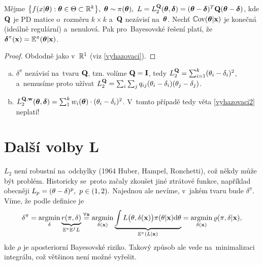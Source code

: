 \begin{theorem}[Vyhazovací 2]\label{vyhazovaci2}
	Mějme $\big\{ f(x|\boldsymbol{\theta}):\boldsymbol{\theta}\in\Theta\subset\mathbb{R}^k \big\},~\boldsymbol{\theta}\sim\pi(\boldsymbol{\theta}),~L=L_2^{\textbf{Q}}(\boldsymbol{\theta},\boldsymbol{\delta})=(\boldsymbol{\theta}-\boldsymbol{\delta})^T\textbf{Q}(\boldsymbol{\theta}-\boldsymbol{\delta})$, kde $\textbf{Q}$ je PD matice o~rozměru $k\times k$ a~$\textbf{Q}$ nezávisí na~$\boldsymbol{\theta}$. Nechť $\mathbb{C}\mathrm{ov}(\boldsymbol{\theta}|\textbf{x})$ je konečná (ideálně regulární) a~nenulová. Pak pro~Bayesovské řešení platí, že  $\boldsymbol{\delta}^\pi(\textbf{x})=\mathbb{E}^\pi(\boldsymbol{\theta}|\textbf{x})$. 
	\begin{proof}
		Obdodně jako v~$\mathbb{R}^1$ (viz \ref{vyhazovaci}).
	\end{proof}
\end{theorem}
\begin{remark}
	\begin{enumerate}[a)]
		\item $\delta^\pi$ nezávisí na~tvaru $\textbf{Q}$, tzn. volíme $\textbf{Q}=\textbf{I}$, tedy $L_2^{\textbf{Q}}=\sum_{i=1}^k (\theta_i-\delta_i)^2$, a~nemusíme proto užívat $L_2^{\textbf{Q}}=\sum_i\sum_j q_{ij}(\theta_i-\delta_i)(\theta_j-\delta_j)$.
		\item $L_2^{\textbf{Q},\textbf{w}}(\boldsymbol{\theta},\boldsymbol{\delta})=\sum_1^k w_i(\boldsymbol{\theta})\cdot(\theta_i-\delta_i)^2$. V~tomto případě tedy věta \ref{vyhazovaci2} neplatí! 
	\end{enumerate}
\end{remark}

\section{Další volby L}
$L_2$ není robustní na~odchylky (1964 Huber, Hampel, Ronchetti), což někdy může být problém. Historicky se~proto začaly zkoušet jiné ztrátové funkce, například obecněji $L_p=(\theta-\delta)^p,~p\in(1,2).$ Najednou ale nevíme, v~jakém tvaru bude $\delta^\pi$. Víme, že podle definice je 
$$\delta^\pi=\mathop{\mathrm{argmin}}_\delta \underbrace{r(\pi,\delta)}_{\mathbb{E}^\pi \mathbb{E}^f L}\stackrel{\forall\textbf{x}}{=}
\mathop{\mathrm{argmin}}_{\delta(\textbf{x})}
\underbrace{\int L\big(\theta,\delta(\textbf{x})\big)\pi(\theta|\textbf{x})\mathrm{d}\theta}_{\mathbb{E}^\pi(L|\textbf{x})}= \mathop{\mathrm{argmin}}_{\delta(\textbf{x})}\varrho(\pi,\delta|\textbf{x}) 
,$$ kde $\rho$ je aposteriorní Bayesovské riziko. Takový způsob ale vede na~minimalizaci integrálu, což většinou není možné vyřešit.


